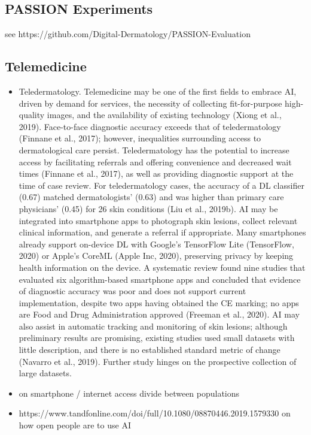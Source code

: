 \documentclass[12pt, a4paper, oneside]{book}   	%
\newif\ifrawcitationactive
\newcommand{\rawcitationstart}{\color{purple}\rawcitationactivetrue}
\begin{document}
			\subsection{PASSION Experiments}
				see https://github.com/Digital-Dermatology/PASSION-Evaluation
		
			\subsection{Telemedicine}
				\rawcitationstart
				\begin{itemize}
					\item Teledermatology. Telemedicine may be one of the first fields to embrace AI, driven by demand for services, the necessity of collecting fit-for-purpose high-quality images, and the availability of existing technology (Xiong et al., 2019). Face-to-face diagnostic accuracy exceeds that of teledermatology (Finnane et al., 2017); however, inequalities surrounding access to dermatological care persist. Teledermatology has the potential to increase access by facilitating referrals and offering convenience and decreased wait times (Finnane et al., 2017), as well as providing diagnostic support at the time of case review. For teledermatology cases, the accuracy of a DL classifier (0.67) matched dermatologists’ (0.63) and was higher than primary care physicians’ (0.45) for 26 skin conditions (Liu et al., 2019b). AI may be integrated into smartphone apps to photograph skin lesions, collect relevant clinical information, and generate a referral if appropriate. Many smartphones already support on-device DL with Google’s TensorFlow Lite (TensorFlow, 2020) or Apple’s CoreML (Apple Inc, 2020), preserving privacy by keeping health information on the device. A systematic review found nine studies that evaluated six algorithm-based smartphone apps and concluded that evidence of diagnostic accuracy was poor and does not support current implementation, despite two apps having obtained the CE marking; no apps are Food and Drug Administration approved (Freeman et al., 2020). AI may also assist in automatic tracking and monitoring of skin lesions; although preliminary results are promising, existing studies used small datasets with little description, and there is no established standard metric of change (Navarro et al., 2019). Further study hinges on the prospective collection of large datasets. \autocite{Young_2020}
					\item \autocite{Tsetsi_2017} on smartphone / internet access divide between populations
					\item https://www.tandfonline.com/doi/full/10.1080/08870446.2019.1579330 on how open people are to use AI

\end{itemize}
\end{document}
